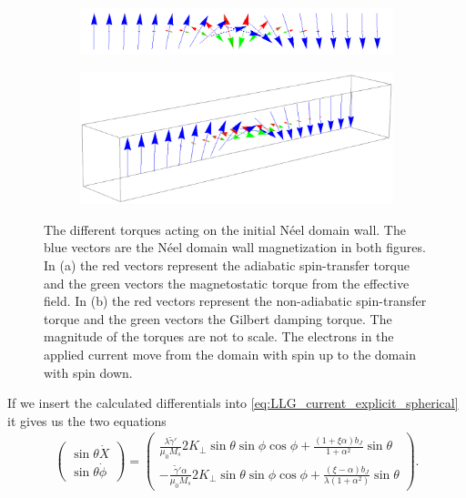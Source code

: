 \documentclass[12pt, a4paper, twoside, openright]{article}		%
\numberwithin{equation}{section}
\begin{document}
\begin{figure}[h!]
\centering
\begin{subfigure}{\textwidth}
  \centering
  \includegraphics[width=1.0\linewidth]{Figures/NeelWallAdSTTHeff.png}
  \caption{}
  \label{fig:Neel_AdSTT_Heff}
\end{subfigure}
\begin{subfigure}{\textwidth}
  \centering
  \includegraphics[width=1.0\linewidth]{Figures/NeelWallNonAdSTTGD.png}
  \caption{}
  \label{fig:Neel_NonAdSTT_GD}
\end{subfigure}
\caption{The different torques acting on the initial N\'{e}el domain wall. The blue vectors are the N\'{e}el domain wall magnetization in both figures. In (a) the red vectors represent the adiabatic spin-transfer torque and the green vectors the magnetostatic torque from the effective field. In (b) the red vectors represent the non-adiabatic spin-transfer torque and the green vectors the Gilbert damping torque. The magnitude of the torques are not to scale. The electrons in the applied current move from the domain with spin up to the domain with spin down.}
\end{figure}
If we insert the calculated differentials into \eqref{eq:LLG_current_explicit_spherical} it gives us the two equations
\begin{align}
\begin{pmatrix}
\sin\theta\dot{X} \\ \sin\theta\dot{\phi}
\end{pmatrix}
=
\begin{pmatrix}
\frac{\lambda \tilde{\gamma}'}{\mu_0 M_s} 2 K_{\perp} \sin\theta\sin\phi\cos\phi + \frac{(1+\xi\alpha)b_J}{1+\alpha^2}\sin\theta \\
-\frac{\tilde{\gamma}'\alpha}{\mu_0 M_s}2 K_{\perp} \sin\theta\sin\phi\cos\phi + \frac{(\xi-\alpha)b_J}{\lambda(1+\alpha^2)}\sin\theta
\end{pmatrix}.
\end{align}
\end{document}
